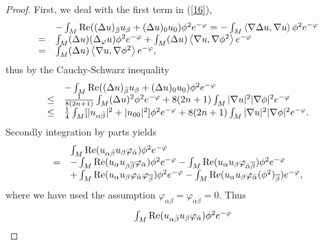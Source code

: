 \documentclass[12pt]{amsart}%
\numberwithin{equation}{section}
\begin{document}
\begin{proof}
First, we deal with the first term in (\ref{16}),
\[%
\begin{array}
[c]{ll}
& -\int_{M}\mathrm{\operatorname{Re}}((\Delta u)_{\bar{\beta}}u_{\beta
}+(\Delta u)_{0}u_{0})\phi^{2}e^{-\varphi}=-\int_{M}\left\langle \nabla\Delta
u,\nabla u\right\rangle \phi^{2}e^{-\varphi}\\
= & \int_{M}(\Delta u)(\Delta_{\varphi}u)\phi^{2}e^{-\varphi}+\int_{M}(\Delta
u)\left\langle \nabla u,\nabla\phi^{2}\right\rangle e^{-\varphi}\\
= & \int_{M}(\Delta u)\left\langle \nabla u,\nabla\phi^{2}\right\rangle
e^{-\varphi},
\end{array}
\]
thus by the Cauchy-Schwarz inequality
\begin{equation}%
\begin{array}
[c]{ll}
& -\int_{M}\mathrm{\operatorname{Re}}((\Delta u)_{\bar{\beta}}u_{\beta
}+(\Delta u)_{0}u_{0})\phi^{2}e^{-\varphi}\\
\leq & \frac{1}{8(2n+1)}\int_{M}(\Delta u)^{2}\phi^{2}e^{-\varphi}%
+8(2n+1)\int_{M}|\nabla u|^{2}|\nabla\phi|^{2}e^{-\varphi}\\
\leq & \frac{1}{4}\int_{M}[|u_{\alpha\bar{\beta}}|^{2}+|u_{00}|^{2}]\phi
^{2}e^{-\varphi}+8(2n+1)\int_{M}|\nabla u|^{2}|\nabla\phi|^{2}e^{-\varphi}.
\end{array}
\label{17}%
\end{equation}
Secondly integration by parts yields
\[%
\begin{array}
[c]{ll}
& \int_{M}\operatorname{Re}(u_{\alpha\bar{\beta}}u_{\beta}\varphi_{\bar
{\alpha}})\phi^{2}e^{-\varphi}\\
= & -\int_{M}\operatorname{Re}(u_{\alpha}u_{\beta\overline{\beta}}%
\varphi_{\bar{\alpha}})\phi^{2}e^{-\varphi}-\int_{M}\operatorname{Re}%
(u_{\alpha}u_{\beta}\varphi_{\bar{\alpha}\overline{\beta}})\phi^{2}%
e^{-\varphi}\\
& +\int_{M}\operatorname{Re}(u_{\alpha}u_{\beta}\varphi_{\bar{\alpha}}%
\varphi_{\overline{\beta}})\phi^{2}e^{-\varphi}-\int_{M}\operatorname{Re}%
(u_{\alpha}u_{\beta}\varphi_{\bar{\alpha}}(\phi^{2})_{\overline{\beta}%
})e^{-\varphi},
\end{array}
\]
where we have used the assumption $\varphi_{\alpha\beta}=\varphi_{\bar{\alpha
}\overline{\beta}}=0.$ Thus%
\begin{equation}%
\begin{array}
[c]{ll}
& \int_{M}\operatorname{Re}(u_{\alpha\bar{\beta}}u_{\beta}\varphi_{\bar
{\alpha}})\phi^{2}e^{-\varphi}\\

\end{array}
\end{equation}
\end{proof}
\end{document}
